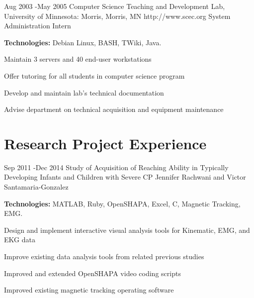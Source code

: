 \documentclass[10pt]{article} %
\begin{document}

\job
{Aug 2003 -}{May 2005}
{Computer Science Teaching and Development Lab, University of Minnesota: Morris, Morris, MN}
{http://www.scec.org}
{System Administration Intern}
{\rule{0mm}{5mm}\textbf{Technologies:} Debian Linux, BASH, TWiki, Java.

\begin{itemize-noindent}
\setlength\itemsep{0.12em}
\item{Maintain 3 servers and 40 end-user workstations}
\item{Offer tutoring for all students in computer science program}
\item{Develop and maintain lab's technical documentation}
\item{Advise department on technical acquisition and equipment maintenance}
\end{itemize-noindent}

}


\section{Research Project Experience}

\project
{Sep 2011 -}{Dec 2014}
{Study of Acquisition of Reaching Ability in Typically Developing Infants and Children with Severe CP}
{Jennifer Rachwani and Victor Santamaria-Gonzalez}
{\rule{0mm}{5mm}\textbf{Technologies:} MATLAB, Ruby, OpenSHAPA, Excel, C, Magnetic Tracking, EMG.

\begin{itemize-noindent}
\setlength\itemsep{0.12em}
\item{Design and implement interactive visual analysis tools for Kinematic, EMG, and EKG data}
\item{Improve existing data analysis tools from related previous studies}
\item{Improved and extended OpenSHAPA video coding scripts}
\item{Improved existing magnetic tracking operating software}
\end{itemize-noindent}

}
\end{document}
